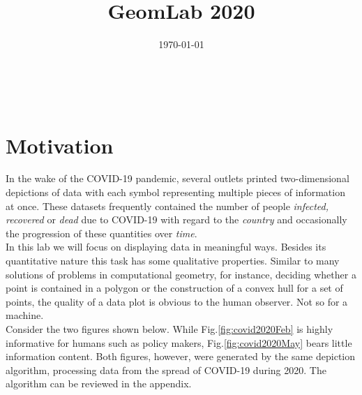 \documentclass[a4paper,11pt]{article}
\makeatletter
\renewcommand{\maketitle}{
  \begin{center}
    \vspace{2ex}
    {\huge \textsc{\@title}}
    \vspace{1ex}
    \\
    \@author \hfill \@date
    \vspace{4ex}
  \end{center}
}
\makeatother
\begin{document}

\title{GeomLab 2020}
\author{}
\date{\today}
\maketitle

\tableofcontents

\newpage

\section{Motivation}

In the wake of the COVID-19 pandemic, several outlets printed two-dimensional depictions of data with each symbol representing multiple pieces of information at once. These datasets frequently contained the number of people \textit{infected, recovered} or \textit{dead} due to COVID-19 with regard to the \textit{country} and occasionally the progression of these quantities over \textit{time}.\\

In this lab we will focus on displaying data in meaningful ways. Besides its quantitative nature this task has some qualitative properties. Similar to many solutions of problems in computational geometry, for instance, deciding whether a point is contained in a polygon or the construction of a convex hull for a set of points, the quality of a data plot is obvious to the human observer. Not so for a machine.\\

Consider the two figures shown below. While Fig.\ref{fig:covid2020Feb} is highly informative for humans such as policy makers, Fig.\ref{fig:covid2020May} bears little information content. Both figures, however, were generated by the same depiction algorithm, processing data from the spread of COVID-19 during 2020. The algorithm can be reviewed in the appendix.\\
\end{document}
